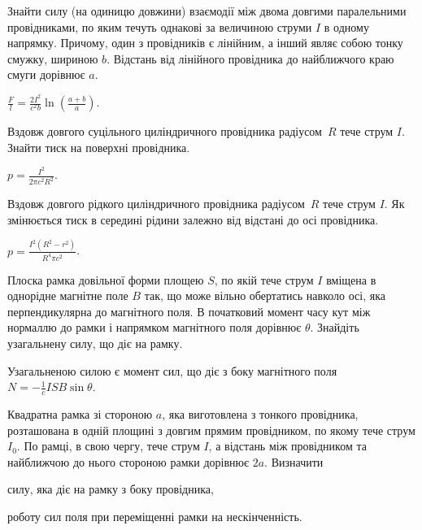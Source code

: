 \begin{problem}
    Знайти силу  (на одиницю довжини) взаємодії між двома довгими паралельними провідниками, по яким течуть однакові за величиною струми $I$ в одному напрямку. Причому, один з провідників є лінійним, а інший являє собою тонку смужку, шириною $b$. Відстань від лінійного провідника до найближчого краю смуги дорівнює $a$.
\begin{solution}
	$\frac{F}{l} = \frac{2I^2}{c^2b}\ln\left( \frac{a + b}{a}\right) $.
\end{solution}
\end{problem}


\begin{problem} %
Вздовж довгого суцільного циліндричного провідника радіусом~$R$ тече струм $I$. Знайти тиск на поверхні провідника.
\begin{solution}
	$p = \frac{I^2}{2\pi c^2R^2}$.
\end{solution}
\end{problem}

\begin{problem} %
Вздовж довгого рідкого циліндричного провідника радіусом~$R$ тече струм $I$. Як змінюється тиск в середині рідини залежно від відстані до осі провідника.
\begin{solution}
	$p = \frac{I^2(R^2 - r^2)}{R^4\pi c^2}$.
\end{solution}
\end{problem}

\begin{problem}
    Плоска рамка довільної форми площею $S$,  по якій тече  струм $I$ вміщена в однорідне магнітне поле $B$ так, що може вільно обертатись навколо осі, яка перпендикулярна до магнітного поля. В початковий момент часу кут між нормаллю до рамки і напрямком магнітного поля дорівнює $\theta$. Знайдіть узагальнену силу, що діє на рамку.
\begin{solution}
	Узагальненою силою є момент сил, що діє з боку магнітного поля $N = -\frac1c ISB\sin\theta$.
\end{solution}
\end{problem}


\begin{problem} %
Квадратна рамка зі стороною $a$, яка виготовлена з тонкого провідника, розташована в одній площині з довгим прямим провідником, по якому тече струм $I_0$. По рамці, в свою чергу, тече струм $I$, а відстань між провідником та найближчою до нього стороною рамки дорівнює $2a$. Визначити
\begin{enumerate*}[label=\alph*)]
	\item силу, яка діє на рамку з боку провідника,
	\item роботу сил поля при переміщенні рамки на нескінченність.
\end{enumerate*}
\end{problem}

